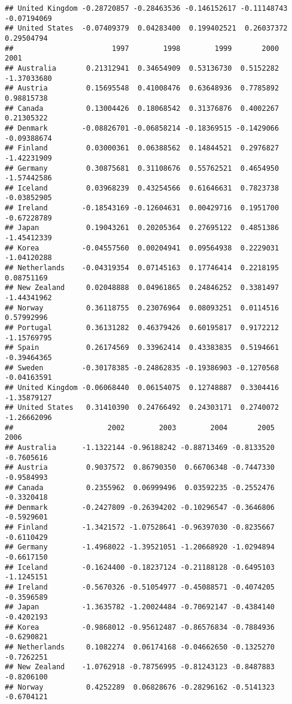 \documentclass[
]{article}
\begin{document}
\begin{verbatim}
## United Kingdom -0.28720857 -0.28463536 -0.146152617 -0.11148743 -0.07194069
## United States  -0.07409379  0.04283400  0.199402521  0.26037372  0.29504794
##                       1997        1998        1999       2000        2001
## Australia       0.21312941  0.34654909  0.53136730  0.5152282 -1.37033680
## Austria         0.15695548  0.41008476  0.63648936  0.7785892  0.98815738
## Canada          0.13004426  0.18068542  0.31376876  0.4002267  0.21305322
## Denmark        -0.08826701 -0.06858214 -0.18369515 -0.1429066 -0.09388674
## Finland         0.03000361  0.06388562  0.14844521  0.2976827 -1.42231909
## Germany         0.30875681  0.31108676  0.55762521  0.4654950 -1.57442586
## Iceland         0.03968239  0.43254566  0.61646631  0.7823738 -0.03852905
## Ireland        -0.18543169 -0.12604631  0.00429716  0.1951700 -0.67228789
## Japan           0.19043261  0.20205364  0.27695122  0.4851386 -1.45412339
## Korea          -0.04557560  0.00204941  0.09564938  0.2229031 -1.04120288
## Netherlands    -0.04319354  0.07145163  0.17746414  0.2218195  0.08751169
## New Zealand     0.02048888  0.04961865  0.24846252  0.3381497 -1.44341962
## Norway          0.36118755  0.23076964  0.08093251  0.0114516  0.57992996
## Portugal        0.36131282  0.46379426  0.60195817  0.9172212 -1.15769795
## Spain           0.26174569  0.33962414  0.43383835  0.5194661 -0.39464365
## Sweden         -0.30178385 -0.24862835 -0.19386903 -0.1270568 -0.04163591
## United Kingdom -0.06068440  0.06154075  0.12748887  0.3304416 -1.35879127
## United States   0.31410390  0.24766492  0.24303171  0.2740072 -1.26662096
##                      2002        2003        2004       2005       2006
## Australia      -1.1322144 -0.96188242 -0.88713469 -0.8133520 -0.7605616
## Austria         0.9037572  0.86790350  0.66706348 -0.7447330 -0.9584993
## Canada          0.2355962  0.06999496  0.03592235 -0.2552476 -0.3320418
## Denmark        -0.2427809 -0.26394202 -0.10296547 -0.3646806 -0.5929601
## Finland        -1.3421572 -1.07528641 -0.96397030 -0.8235667 -0.6110429
## Germany        -1.4968022 -1.39521051 -1.20668920 -1.0294894 -0.6617150
## Iceland        -0.1624400 -0.18237124 -0.21188128 -0.6495103 -1.1245151
## Ireland        -0.5670326 -0.51054977 -0.45088571 -0.4074205 -0.3596589
## Japan          -1.3635782 -1.20024484 -0.70692147 -0.4384140 -0.4202193
## Korea          -0.9868012 -0.95612487 -0.86576834 -0.7884936 -0.6290821
## Netherlands     0.1082274  0.06174168 -0.04662650 -0.1325270 -0.7262251
## New Zealand    -1.0762918 -0.78756995 -0.81243123 -0.8487883 -0.8206100
## Norway          0.4252289  0.06828676 -0.28296162 -0.5141323 -0.6704121

\end{verbatim}
\end{document}
